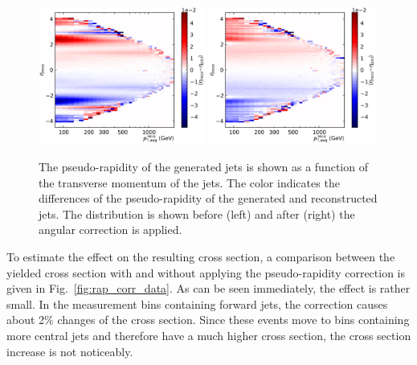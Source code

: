 \begin{figure}[htbp]
    \centering
    \includegraphics[width=0.49\textwidth]{figures/measurement/genvsreco_eta_vs_genpt.pdf}\hfill
    \includegraphics[width=0.49\textwidth]{figures/measurement/genvsreco_eta_vs_genpt_corr.pdf}
    \caption[Differences of pseudo-rapidity of reconstructed jets and particle level jets as a function of the reconstructed jet \pt]
            {The pseudo-rapidity of the
            generated jets is shown as a function of the transverse momentum of
            the jets. The color indicates the differences of the pseudo-rapidity
            of the generated and reconstructed jets. The distribution is shown
            before (left) and after (right) the angular
        correction is applied.}
    \label{fig:jet_eta_corr_vs_pt}
\end{figure}

To estimate the effect on the resulting cross section, a comparison between the
yielded cross section with and without applying the pseudo-rapidity correction
is given in Fig.~\ref{fig:rap_corr_data}. As can be seen immediately, the effect is
rather small. In the measurement bins containing forward jets, the correction
causes about 2\% changes of the cross section. Since these events move to bins
containing more central jets and therefore have a much higher cross section, the
cross section increase is not noticeably.

